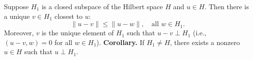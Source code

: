 Suppose $H_1$ is a closed subspace of the Hilbert space $H$ and $u \in H$. Then there is a unique $v \in H_1$ closest to $u$:
$$\|u - v\| \leq \|u - w\|, \quad \text{all } w \in H_1.$$
Moreover, $v$ is the unique element of $H_1$ such that $u - v \perp H_1$ (i.e., $(u-v, w) = 0$ for all $w \in H_1$).
\textbf{Corollary.} If $H_1 \neq H$, there exists a nonzero $u \in H$ such that $u \perp H_1$.
